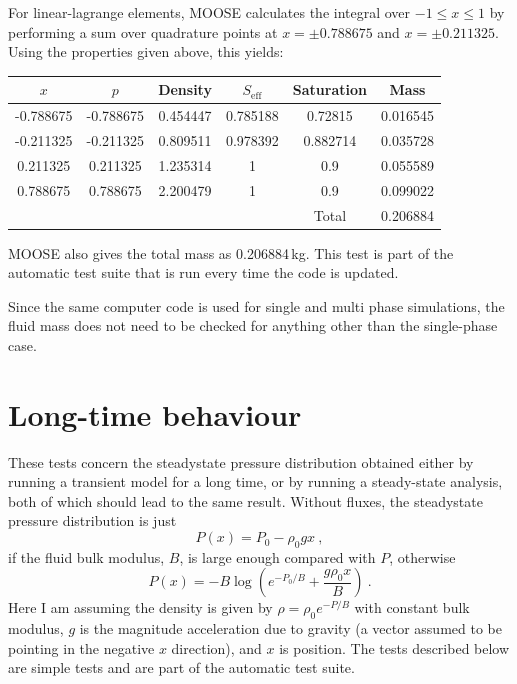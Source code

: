 \documentclass[]{scrreprt}
\begin{document}
For linear-lagrange elements, MOOSE calculates the integral over
$-1\leq x \leq 1$ by performing a sum over quadrature points at
$x=\pm 0.788675$ and $x=\pm 0.211325$.
Using the properties given above, this yields:
\begin{center}
\begin{tabular}{|cccccc|}
\hline
$x$ & $p$ & Density & $S_{\mathrm{eff}}$ & Saturation & Mass \\
\hline
-0.788675 & -0.788675 & 0.454447 & 0.785188 & 0.72815 & 0.016545 \\
-0.211325 & -0.211325 & 0.809511 & 0.978392 & 0.882714 & 0.035728 \\
0.211325 & 0.211325 & 1.235314 & 1 & 0.9 & 0.055589 \\
0.788675 & 0.788675 & 2.200479 & 1 & 0.9 & 0.099022 \\
\hline
 & & & & Total & 0.206884 \\
\hline
\end{tabular} 
\end{center}
MOOSE also gives the total mass as 0.206884\,kg.  This test is part of
the automatic test suite that is run every time the code is updated.

Since the same computer code is used for single and multi phase
simulations, the fluid mass does not need to be checked for anything
other than the single-phase case.





\chapter{Long-time behaviour}
\label{gh}

These tests concern the steadystate pressure distribution obtained
either by running a transient model for a long time, or by running a
steady-state analysis, both of which should lead to the same result.
Without fluxes, the steadystate pressure distribution is just
\begin{equation}
P(x) = P_{0} - \rho_{0} g x \ ,
\end{equation}
if the fluid bulk modulus, $B$, is large enough compared with $P$, otherwise
\begin{equation}
P(x) = -B \log\left( e^{-P_{0}/B} + \frac{g\rho_{0}x}{B} \right) \ .
\label{grav.head.eqn}
\end{equation}
Here I am assuming the density is given by $\rho = \rho_{0}e^{-P/B}$
with constant bulk modulus, $g$ is the
magnitude acceleration due to gravity (a vector assumed to be pointing in the
negative $x$ direction), and $x$ is position.  The tests described below
are simple tests and are part of the automatic test suite.
\end{document}
